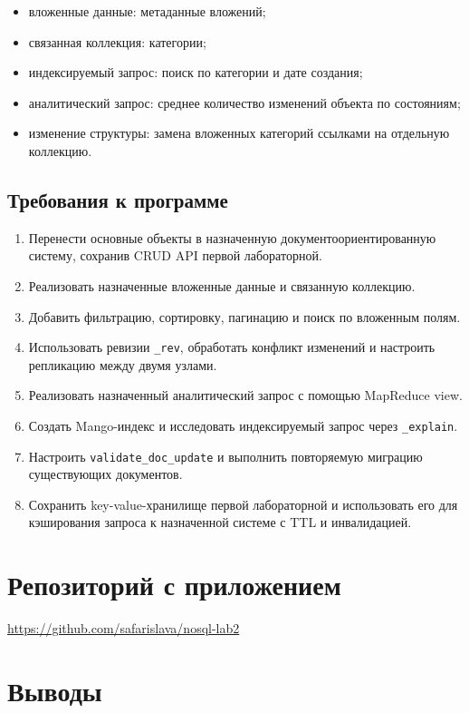 \documentclass[12pt,a4paper]{article}
\begin{document}
\begin{itemize}
    \item вложенные данные: метаданные вложений;
    \item связанная коллекция: категории;
    \item индексируемый запрос: поиск по категории и дате создания;
    \item аналитический запрос: среднее количество изменений объекта по состояниям;
    \item изменение структуры: замена вложенных категорий ссылками на отдельную коллекцию.
\end{itemize}

\subsection*{Требования к программе}

\begin{enumerate}
    \item Перенести основные объекты в назначенную документоориентированную систему, сохранив CRUD API первой лабораторной.
    \item Реализовать назначенные вложенные данные и связанную коллекцию.
    \item Добавить фильтрацию, сортировку, пагинацию и поиск по вложенным полям.
    \item Использовать ревизии \texttt{\_rev}, обработать конфликт изменений и настроить репликацию между двумя узлами.
    \item Реализовать назначенный аналитический запрос с помощью MapReduce view.
    \item Создать Mango-индекс и исследовать индексируемый запрос через \texttt{\_explain}.
    \item Настроить \texttt{validate\_doc\_update} и выполнить повторяемую миграцию существующих документов.
    \item Сохранить key-value-хранилище первой лабораторной и использовать его для кэширования запроса к назначенной системе с TTL и инвалидацией.
\end{enumerate}

\section*{Репозиторий с приложением}

\url{https://github.com/safarislava/nosql-lab2}

\section*{Выводы}
\end{document}
